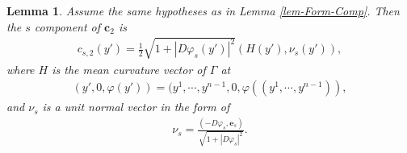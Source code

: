 \documentclass[11pt,reqno]{amsart}
\newtheorem{lemma}[theorem]{Lemma}
\theoremstyle{definition}
\numberwithin{equation}{section}
\begin{document}
\begin{lemma}\label{lem-c2} Assume the same hypotheses as in Lemma \ref{lem-Form-Comp}. Then the $s$ component of $\mathbf c_{2}$ is
\begin{align}\label{eq-c-s2}
    c_{s,2}(y') = \frac{1}{2}\sqrt{1+|D\varphi_s(y')|^2} (H(y'), \nu_s(y')),
\end{align}
where $H$ is the mean curvature vector of $\Gamma$ at 
\begin{align}
 (y', 0, \varphi(y')) = (y^1,\cdots, y^{n-1}, 0, \varphi((y^1,\cdots, y^{n-1})),  
\end{align} and $\nu_s$ is a unit normal vector in the form of
\begin{align}
    \nu_s = \frac{(-D\varphi_s, \mathbf e_s)}{\sqrt{1+|D \varphi_s|^2}}.
\end{align}
\end{lemma}
\end{document}
